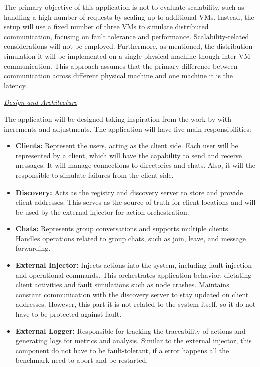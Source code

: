 The primary objective of this application is not to evaluate scalability, such as handling a high number of requests by scaling up to additional \glspl{VM}. Instead, the setup will use a fixed number of three \glspl{VM} to simulate distributed communication, focusing on fault tolerance and performance. Scalability-related considerations will not be employed. Furthermore, as mentioned, the distribution simulation it will be implemented on a single physical machine though inter-VM communication. This approach assumes that the primary difference between communication across different physical machine and one machine it is the latency.

\textit{\underline{Design and Architecture}}

The application will be designed taking inspiration from the work by \textcite{Randtoul2022} with increments and adjustments. The application will have five main responsibilities:

\begin{itemize}
    \item \textbf{Clients:} Represent the users, acting as the client side. Each user will be represented by a client, which will have the capability to send and receive messages. It will manage connections to directories and chats. Also, it will the responsible to simulate failures from the client side.

    \item \textbf{Discovery:} Acts as the registry and discovery server to store and provide client addresses. This serves as the source of truth for client locations and will be used by the external injector for action orchestration.

    \item \textbf{Chats:} Represents group conversations and supports multiple clients. Handles operations related to group chats, such as join, leave, and message forwarding.

    \item \textbf{External Injector:} Injects actions into the system, including fault injection and operational commands. This orchestrates application behavior, dictating client activities and fault simulations such as node crashes. Maintains constant communication with the discovery server to stay updated on client addresses. However, this part it is not related to the system itself, so it do not have to be protected against fault.

    \item \textbf{External Logger:} Responsible for tracking the traceability of actions and generating logs for metrics and analysis. Similar to the external injector, this component do not have to be fault-tolerant, if a error happens all the benchmark need to abort and be restarted.
\end{itemize}

